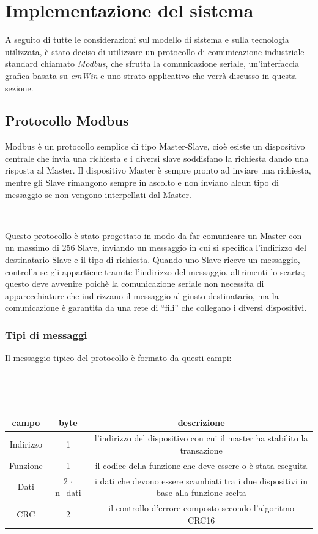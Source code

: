 \documentclass[a4paper,titlepage]{book}
\begin{document}
\chapter{Implementazione del sistema}


A seguito di tutte le considerazioni sul modello di sistema e sulla tecnologia utilizzata, è stato deciso di utilizzare un protocollo di comunicazione industriale standard chiamato \textit{Modbus}, che sfrutta la comunicazione seriale, un'interfaccia grafica basata su \textit{emWin} e uno strato applicativo che verrà discusso in questa sezione. 

\section{Protocollo Modbus}


Modbus è un protocollo semplice di tipo Master-Slave, cioè esiste un dispositivo centrale che invia una richiesta e i diversi slave soddisfano la richiesta dando una risposta al Master. Il dispositivo Master è sempre pronto ad inviare una richiesta, mentre gli Slave rimangono sempre in ascolto e non inviano alcun tipo di messaggio se non vengono interpellati dal Master.

~

Questo protocollo è stato progettato in modo da far comunicare un Master con un massimo di 256 Slave, inviando un messaggio in cui si specifica l'indirizzo del destinatario Slave e il tipo di richiesta. Quando uno Slave riceve un messaggio, controlla se gli appartiene tramite l'indirizzo del messaggio, altrimenti lo scarta; questo deve avvenire poichè la comunicazione seriale non necessita di apparecchiature che indirizzano il messaggio al giusto destinatario, ma la comunicazione è garantita da una rete di ``fili'' che collegano i diversi dispositivi.

\subsection{Tipi di messaggi}

Il messaggio tipico del protocollo è formato da questi campi:

~

~

\begin{tabular}{|c  c  c|}
\hline
\multicolumn{1}{|c|}{\textbf {campo}} & \multicolumn{1}{c}{\textbf {byte}} & \multicolumn{1}{|c|}{\textbf {descrizione}} \\
\hline
Indirizzo	&	1	&	l'indirizzo del dispositivo con cui il master ha stabilito la transazione\\

Funzione	&	1	&	il codice della funzione che deve essere o è stata eseguita \\

Dati		&	2 $\cdot$ n\_dati	&	i dati che devono essere scambiati tra i due dispositivi in base alla funzione scelta \\

CRC		&	2			&	il controllo d'errore composto secondo l'algoritmo CRC16 \\

\hline
\end{tabular}
\end{document}
